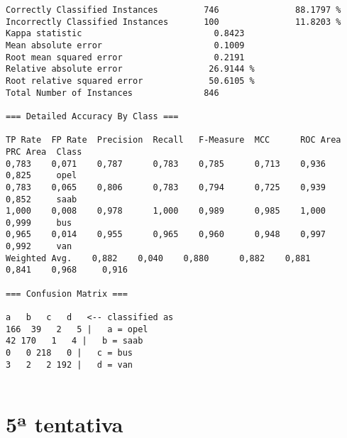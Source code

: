 \documentclass[
	article,			%
	11pt,				%
	oneside,			%
	a4paper,			%
	english,			%
	brazil,				%
	sumario=tradicional
	]{abntex2}
\begin{document}
\begin{lstlisting}
Correctly Classified Instances         746               88.1797 %
Incorrectly Classified Instances       100               11.8203 %
Kappa statistic                          0.8423
Mean absolute error                      0.1009
Root mean squared error                  0.2191
Relative absolute error                 26.9144 %
Root relative squared error             50.6105 %
Total Number of Instances              846     

=== Detailed Accuracy By Class ===

TP Rate  FP Rate  Precision  Recall   F-Measure  MCC      ROC Area  PRC Area  Class
0,783    0,071    0,787      0,783    0,785      0,713    0,936     0,825     opel
0,783    0,065    0,806      0,783    0,794      0,725    0,939     0,852     saab
1,000    0,008    0,978      1,000    0,989      0,985    1,000     0,999     bus
0,965    0,014    0,955      0,965    0,960      0,948    0,997     0,992     van
Weighted Avg.    0,882    0,040    0,880      0,882    0,881      0,841    0,968     0,916     

=== Confusion Matrix ===

a   b   c   d   <-- classified as
166  39   2   5 |   a = opel
42 170   1   4 |   b = saab
0   0 218   0 |   c = bus
3   2   2 192 |   d = van


\end{lstlisting}

\section{5ª tentativa}
\end{document}
